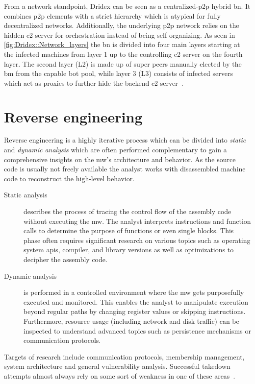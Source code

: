 From a network standpoint, Dridex can be seen as a centralized-\gls{p2p} hybrid \gls{bn}.
It combines \gls{p2p} elements with a strict hierarchy which is atypical for fully decentralized networks.
Additionally, the underlying \gls{p2p} network relies on the hidden \gls{c2} server for orchestration instead of being self-organizing.
As seen in \autoref{fig:Dridex::Network_layers} the \gls{bn} is divided into four main layers starting at the infected machines from layer 1 up to the controlling \gls{c2} server on the fourth layer.
The second layer (L2) is made up of super peers manually elected by the \gls{bm} from the capable \gls{bot} pool, while layer 3 (L3) consists of infected servers which act as proxies to further hide the backend \gls{c2} server~\cite{blueliv2015chasing}.


\section{Reverse engineering\label{sec:Related_work::Reverse_engineering}}
Reverse engineering is a highly iterative process which can be divided into \emph{static} and \emph{dynamic analysis} which are often performed complementary to gain a comprehensive insights on the \gls{mw}'s architecture and behavior.
As the source code is usually not freely available the analyst works with disassembled machine code to reconstruct the high-level behavior.

\begin{description}
    \item[Static analysis] describes the process of tracing the control flow of the assembly code without executing the \gls{mw}.
    The analyst interprets instructions and function calls to determine the purpose of functions or even single blocks.
    This phase often requires significant research on various topics such as operating system \glspl{api}, compiler, and library versions as well as optimizations to decipher the assembly code.
    \item[Dynamic analysis] is performed in a controlled environment where the \gls{mw} gets purposefully executed and monitored.
    This enables the analyst to manipulate execution beyond regular paths by changing register values or skipping instructions.
    Furthermore, resource usage (including network and disk traffic) can be inspected to understand advanced topics such as persistence mechanisms or communication protocols.
\end{description}

Targets of research include communication protocols, membership management, system architecture and general vulnerability analysis.
Successful takedown attempts almost always rely on some sort of weakness in one of these areas~\cite{dittrich2012so}.


